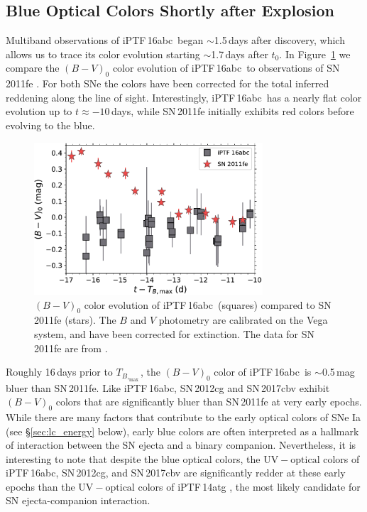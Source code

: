 \documentclass[twocolumn]{aastex61}
\newcommand{\abc}{iPTF\,16abc}
\begin{document}
\subsection{Blue Optical Colors Shortly after Explosion}

Multiband observations of \abc\ began $\sim$1.5\,days after discovery, which
allows us to trace its color evolution starting $\sim$1.7\,days after $t_0$.
In Figure~\ref{fig:B-Vcolors} we compare the $(B - V)_0$ color evolution of
\abc\ to observations of SN\,2011fe \citep{2016ApJ...820...67Z}. For both
SNe the colors have been corrected for the total inferred reddening along
the line of sight. Interestingly, \abc\ has a nearly flat color evolution up
to $t \approx -10$\,days, while SN\,2011fe initially exhibits red colors
before evolving to the blue.

\begin{figure}[]
  \centering
  \includegraphics[width=3.35in]{16abc_11fe_colors.pdf}
  \caption{$(B - V)_0$ color evolution of \abc\ (squares) 
    compared to SN\,2011fe (stars). The $B$ and $V$ photometry are calibrated
    on the Vega system, and have been corrected for extinction. The data for
    SN\,2011fe are from \citet{2016ApJ...820...67Z}.}
  \label{fig:B-Vcolors}
\end{figure}

Roughly 16\,days prior to $T_{B,_\mathrm{max}}$, the $(B - V)_0$ color of
\abc\ is $\sim$0.5\,mag bluer than SN\,2011fe. Like \abc, SN\,2012cg
\citep{2016ApJ...820...92M} and SN\,2017cbv \citep{2017ApJ...845L..11H}
exhibit $(B - V)_0$ colors that are significantly bluer than SN\,2011fe at
very early epochs. While there are many factors that contribute to the early
optical colors of SNe Ia (see \S\ref{sec:lc_energy} below), early blue
colors are often interpreted as a hallmark of interaction between the SN
ejecta and a binary companion. Nevertheless, it is interesting to note that
despite the blue optical colors, the $\mathrm{UV} - \mathrm{optical}$ colors
of \abc, SN\,2012cg, and SN\,2017cbv are significantly redder at these early
epochs than the $\mathrm{UV} - \mathrm{optical}$ colors of iPTF\,14atg
\citep{2015Natur.521..328C}, the most likely candidate for SN
ejecta-companion interaction.
\end{document}
